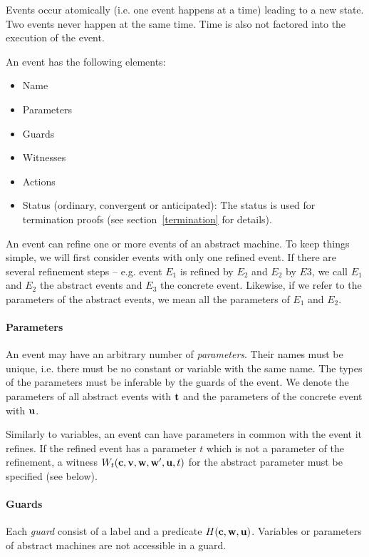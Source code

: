 Events occur atomically (i.e. one event happens at a time) leading to a new state.
Two events never happen at the same time. Time is also not factored into the execution of the event.

An event has the following elements:
\begin{itemize}
\item Name
\item Parameters
\item Guards
\item Witnesses
\item Actions
\item Status (ordinary, convergent or anticipated): The status is used
  for termination proofs (see section~\ref{termination} for details).
\end{itemize}

An event can refine one or more events of an abstract machine. To keep things simple, we will
  first consider events with only one refined event.
If there are several refinement steps -- e.g. event $E_1$ is refined by $E_2$ and $E_2$ by
  $E3$, we call $E_1$ and $E_2$ the abstract events and $E_3$ the concrete event.
Likewise, if we refer to the parameters of the abstract events, we mean all the parameters
  of $E_1$ and $E_2$.

\paragraph{Parameters}
\label{parameters}
An event may have an arbitrary number of \emph{parameters}. Their names must be unique, i.e. there must be no constant or variable with the same name.
The types of the parameters must be inferable by the guards of the event.
We denote the parameters of all abstract events with $\mathbf{t}$ and the
parameters of the concrete event with $\mathbf{u}$.

Similarly to variables, an event can have parameters in common with the event it refines.
If the refined event has a parameter $t$ which is not a parameter of the refinement, 
 a witness $W_t(\mathbf{c},{\mathbf{v},\mathbf{w}},\mathbf{w}',\mathbf{u},t)$ for
 the abstract parameter must be specified (see below).

\paragraph{Guards}
\label{guards}
Each \emph{guard} consist of a label and a predicate $H(\mathbf{c},\mathbf{w},\mathbf{u})$.
Variables or parameters of abstract machines are not accessible in a guard.

